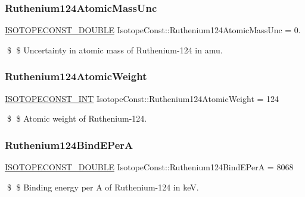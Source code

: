 \subsubsection{\texorpdfstring{Ruthenium124\+Atomic\+Mass\+Unc}{Ruthenium124AtomicMassUnc}}
{\footnotesize\ttfamily \mbox{\hyperlink{group___isotope_const-_macros_ga8f45a7272ce02c0b4c65c44636ed719a}{I\+S\+O\+T\+O\+P\+E\+C\+O\+N\+S\+T\+\_\+\+D\+O\+U\+B\+LE}} Isotope\+Const\+::\+Ruthenium124\+Atomic\+Mass\+Unc = 0.}

\$ \$ Uncertainty in atomic mass of Ruthenium-\/124 in amu. \mbox{\label{group___isotope_const-_ruthenium-_ru124_ga15e401b041eab92a1530f659994024e8}} 
\subsubsection{\texorpdfstring{Ruthenium124\+Atomic\+Weight}{Ruthenium124AtomicWeight}}
{\footnotesize\ttfamily \mbox{\hyperlink{group___isotope_const-_macros_ga5f18360b3e99483a35c32d789e62621c}{I\+S\+O\+T\+O\+P\+E\+C\+O\+N\+S\+T\+\_\+\+I\+NT}} Isotope\+Const\+::\+Ruthenium124\+Atomic\+Weight = 124}

\$ \$ Atomic weight of Ruthenium-\/124. \mbox{\label{group___isotope_const-_ruthenium-_ru124_ga8576757c9bdcaf62afb89c87ae7b1c54}} 
\subsubsection{\texorpdfstring{Ruthenium124\+Bind\+E\+PerA}{Ruthenium124BindEPerA}}
{\footnotesize\ttfamily \mbox{\hyperlink{group___isotope_const-_macros_ga8f45a7272ce02c0b4c65c44636ed719a}{I\+S\+O\+T\+O\+P\+E\+C\+O\+N\+S\+T\+\_\+\+D\+O\+U\+B\+LE}} Isotope\+Const\+::\+Ruthenium124\+Bind\+E\+PerA = 8068}

\$ \$ Binding energy per A of Ruthenium-\/124 in keV. \mbox{\label{group___isotope_const-_ruthenium-_ru124_gafdd79845f765dd604b3cb8d02c5814bf}} 
